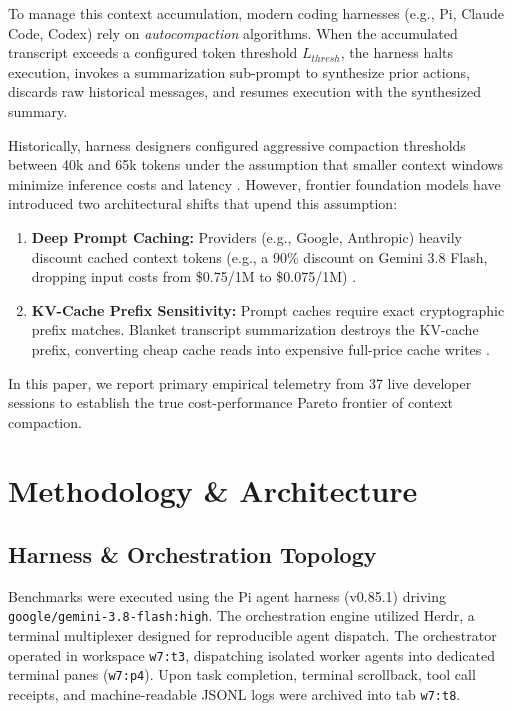 \documentclass[10pt,twocolumn,a4paper]{article}
\begin{document}
To manage this context accumulation, modern coding harnesses (e.g., Pi, Claude Code, Codex) rely on \textit{autocompaction} algorithms. When the accumulated transcript exceeds a configured token threshold $L_{thresh}$, the harness halts execution, invokes a summarization sub-prompt to synthesize prior actions, discards raw historical messages, and resumes execution with the synthesized summary.

Historically, harness designers configured aggressive compaction thresholds between 40k and 65k tokens under the assumption that smaller context windows minimize inference costs and latency \cite{nova2026compaction}. However, frontier foundation models have introduced two architectural shifts that upend this assumption:
\begin{enumerate}
  \item \textbf{Deep Prompt Caching:} Providers (e.g., Google, Anthropic) heavily discount cached context tokens (e.g., a 90\% discount on Gemini 3.8 Flash, dropping input costs from \$0.75/1M to \$0.075/1M) \cite{anthropic2024promptcache,gim2024promptcache}.
  \item \textbf{KV-Cache Prefix Sensitivity:} Prompt caches require exact cryptographic prefix matches. Blanket transcript summarization destroys the KV-cache prefix, converting cheap cache reads into expensive full-price cache writes \cite{gim2024promptcache}.
\end{enumerate}

In this paper, we report primary empirical telemetry from 37 live developer sessions to establish the true cost-performance Pareto frontier of context compaction.

\section{Methodology \& Architecture}

\subsection{Harness \& Orchestration Topology}
Benchmarks were executed using the Pi agent harness (v0.85.1) driving \texttt{google/gemini-3.8-flash:high}. The orchestration engine utilized Herdr, a terminal multiplexer designed for reproducible agent dispatch. The orchestrator operated in workspace \texttt{w7:t3}, dispatching isolated worker agents into dedicated terminal panes (\texttt{w7:p4}). Upon task completion, terminal scrollback, tool call receipts, and machine-readable JSONL logs were archived into tab \texttt{w7:t8}.
\end{document}
